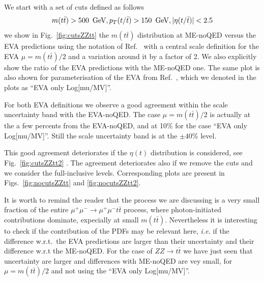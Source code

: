 \documentclass[a4paper,11pt]{article}
\begin{document}
We start with a set of cuts defined as follows
%
\begin{equation}
m(t \bar t) > 500~\,\textrm{GeV}, p_T(t/ \bar t) > 150~\,\textrm{GeV}, |\eta(t/\bar t)|<2.5 
\end{equation}
%
we show in Fig.~\ref{fig:cutsZZtt} the $m(t \bar t)$ distribution at ME-noQED versus the EVA predictions using the notation of Ref.~\cite{Garosi:2023bvq} with a central scale definition for the EVA $\mu=m(t \bar t) /2$ and a variation around it by a factor of 2.
We also explicitly  show the ratio of the EVA predictions with the ME-noQED one. The same plot is also shown for parameterisation of the EVA from Ref.~\cite{Ruiz:2021tdt}, which we denoted in the plots as ``EVA only Log[mu/MV]''.

For both EVA definitions we observe a good agreement within the scale uncertainty band with the EVA-noQED. The case $\mu=m(t \bar t)/2$ is actually at the a few percents from the  EVA-noQED, and at 10\% for the case  ``EVA only Log[mu/MV]''. Still the scale uncertainty band is at the $\pm40\%$ level.

This good agreement deteriorates if the $\eta(t)$ distribution is considered, see Fig.~\ref{fig:cutsZZtt2} .  
The agreement deteriorates also if we remove the cuts and we consider the full-inclusive levels. Corresponding plots are present in Figs.~\ref{fig:nocutsZZtt} and \ref{fig:nocutsZZtt2}. 

It is worth to remind the reader that the process we are discussing is a very small fraction of the entire $\mu^+\mu^-\to\mu^+\mu^- t \bar t$ process, where photon-initiated contributions dominate, expecially at small $m(t \bar t)$. Nevertheless it is interesting to check if the contribution of the PDFs may be relevant here, {\it i.e.} if the difference w.r.t.~the EVA predictions are larger than their uncertainty and their difference w.r.t the ME-noQED. For the case of $ZZ\to t \bar t$ we have just seen that uncertainty are larger and differences with   ME-noQED are vey small, for $\mu=m(t \bar t) /2$ and not using the ``EVA only Log[mu/MV]''.



 
\end{document}

